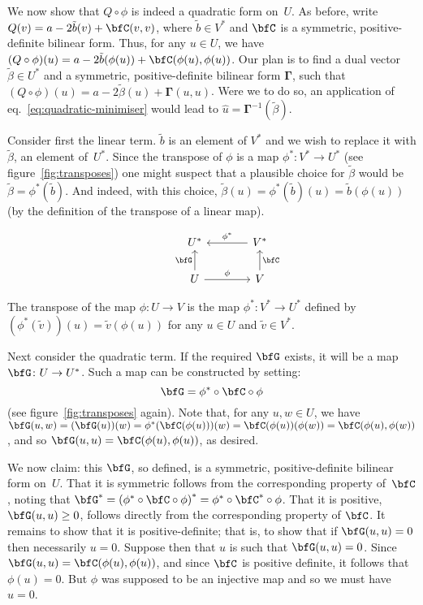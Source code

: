 \documentclass[10pt, a4paper]{article}
\begin{document}
We now show that $Q\circ\phi$ is indeed a quadratic form on~$U$. As before,
write $Q(v)=a -2\tilde{b}(v) + \bfC(v,v)$, where $\tilde{b}\in V^*$ and
$\bfC$ is a symmetric, positive-definite bilinear form. Thus, for any
$u\in U$, we have
$(Q\circ\phi)(u) = a -2\tilde{b}(\phi(u)) + \bfC(\phi(u), \phi(u))$. Our plan is to
find a dual vector $\tilde{\beta}\in U^*$ and a symmetric, positive-definite
bilinear form $\bm{\Gamma}$, such that
$(Q\circ\phi)(u)=a -2\tilde{\beta}(u) + \bm{\Gamma}(u,u)$. Were we to do so, an
application of eq.~\eqref{eq:quadratic-minimiser} would lead to
$\hat{u}=\bm{\Gamma}^{-1}(\tilde{\beta})$.

Consider first the linear term. $\tilde{b}$ is an element of $V^*$ and
we wish to replace it with $\tilde{\beta}$, an element of~$U^*$. Since the
transpose of $\phi$ is a map $\phi^*\colon V^*\to U^*$ (see
figure~\ref{fig:transposes}) one might suspect that a plausible choice
for $\tilde{\beta}$ would be $\tilde{\beta}=\phi^*(\tilde{b})$. And indeed, with
this choice,
$\tilde{\beta}(u) = \phi^*(\tilde{b})(u)= \tilde{b}(\phi(u))$ (by the
definition of the transpose of a linear map).
\begin{marginfigure}
  \[\begin{tikzcd}[column sep=large]
      & U^*  & V^* \arrow[l, "\phi^*"'] \\
      & U \arrow[u, "\bfG"] \arrow[r, "\phi"] & V \arrow[u,
      "\bfC"'] 
    \end{tikzcd}\]
  \caption{The transpose of the map $\phi\colon U\to V$ is the map
    $\phi^*\colon V^*\to U^*$ defined by
    $(\phi^*(\tilde{v}))(u) = \tilde{v}(\phi(u))$ for any $u\in U$ and
    $\tilde{v}\in V^*$. \label{fig:transposes}}
\end{marginfigure} 

Next consider the quadratic term. If the required $\bfG$ exists, it
will be a map $\bfG\colon U\to U^*$. Such a map can be constructed by
setting:
\[
  \bfG = \phi^*\circ \bfC \circ \phi
\]
(see figure~\ref{fig:transposes} again). Note that, for any $u,w\in U$,
we have
$\bfG(u,w) = (\bfG(u))(w) = \phi^*(\bfC(\phi(u)))(w) = \bfC(\phi(u))(\phi(w)) =
\bfC(\phi(u), \phi(w))$, and so $\bfG(u,u)=\bfC(\phi(u), \phi(u))$, as desired.

We now claim: this $\bfG$, so defined, is a symmetric,
positive-definite bilinear form on~$U$. That it is symmetric follows
from the corresponding property of~$\bfC$, noting that
$\bfG^* = {(\phi^*\circ \bfC \circ \phi)}^* = \phi^*\circ \bfC^* \circ \phi$. That it is positive,
$\bfG(u,u)\geq 0$, follows directly from the corresponding property of
$\bfC$. It remains to show that it is positive-definite; that is, to
show that if $\bfG(u,u)=0$ then necessarily $u=0$. Suppose then that
$u$ is such that $\bfG(u,u)=0$. Since
$\bfG(u,u) = \bfC(\phi(u),\phi(u))$, and since $\bfC$ is positive definite,
it follows that $\phi(u)=0$. But $\phi$ was supposed to be an injective map
and so we must have $u=0$.
\end{document}
